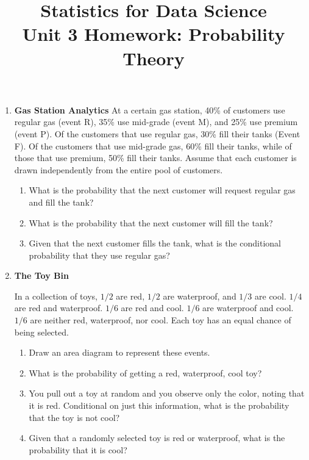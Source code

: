 \documentclass[12pt,a4paper]{article}
\numberwithin{equation}{subsection}
\begin{document}
\title{Statistics for Data Science \\
       Unit 3 Homework: Probability Theory}
\maketitle

\begin{enumerate}

\item \textbf{Gas Station Analytics}
At a certain gas station, 40\% of customers use regular gas (event R), 35\% use mid-grade (event M), and 25\% use premium (event P).  Of the customers that use regular gas, 30\% fill their tanks (Event F).  Of the customers that use mid-grade gas, 60\% fill their tanks, while of those that use premium, 50\% fill their tanks.  Assume that each customer is drawn independently from the entire pool of customers.

\begin{enumerate}
\item What is the probability that the next customer will request regular gas and fill the tank? 
\item What is the probability that the next customer will fill the tank?
\item Given that the next customer fills the tank, what is the conditional probability that they use regular gas?
\end{enumerate}

\item \textbf{The Toy Bin}

 In a collection of toys, $1/2$ are red, $1/2$ are waterproof, and $1/3$ are cool. $1/4$ are red and waterproof.  $1/6$ are red and cool. $1/6$ are waterproof and cool. $1/6$ are neither red, waterproof, nor cool. Each toy has an equal chance of being selected.
 
 \begin{enumerate}
\item Draw an area diagram to represent these events.
\item What is the probability of getting a red, waterproof, cool toy?
\item You pull out a toy at random and you observe only the color, noting that it is red.  Conditional on just this information, what is the probability that the toy is not cool?
\item Given that a randomly selected toy is red or waterproof, what is the probability that it is cool?
\end{enumerate}
 

\end{enumerate}
\end{document}
